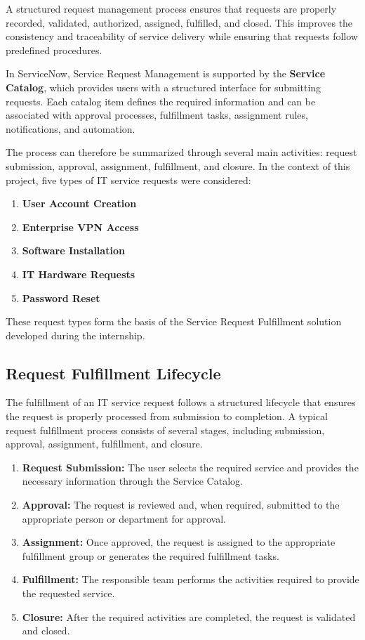 \documentclass[12pt,a4paper]{report}
\begin{document}
A structured request management process ensures that requests are properly
recorded, validated, authorized, assigned, fulfilled, and closed. This
improves the consistency and traceability of service delivery while ensuring
that requests follow predefined procedures.

In ServiceNow, Service Request Management is supported by the
\textbf{Service Catalog}, which provides users with a structured interface
for submitting requests. Each catalog item defines the required information
and can be associated with approval processes, fulfillment tasks, assignment
rules, notifications, and automation.

The process can therefore be summarized through several main activities:
request submission, approval, assignment, fulfillment, and closure. In the
context of this project, five types of IT service requests were considered:

\begin{enumerate}
    \item \textbf{User Account Creation}
    \item \textbf{Enterprise VPN Access}
    \item \textbf{Software Installation}
    \item \textbf{IT Hardware Requests}
    \item \textbf{Password Reset}
\end{enumerate}

These request types form the basis of the Service Request Fulfillment
solution developed during the internship.

\subsection{Request Fulfillment Lifecycle}
The fulfillment of an IT service request follows a structured lifecycle that
ensures the request is properly processed from submission to completion. A
typical request fulfillment process consists of several stages, including
submission, approval, assignment, fulfillment, and closure.

\begin{enumerate}
    \item \textbf{Request Submission:} The user selects the required service
    and provides the necessary information through the Service Catalog.

    \item \textbf{Approval:} The request is reviewed and, when required,
    submitted to the appropriate person or department for approval.

    \item \textbf{Assignment:} Once approved, the request is assigned to the
    appropriate fulfillment group or generates the required fulfillment tasks.

    \item \textbf{Fulfillment:} The responsible team performs the activities
    required to provide the requested service.

    \item \textbf{Closure:} After the required activities are completed, the
    request is validated and closed.
\end{enumerate}
\end{document}

